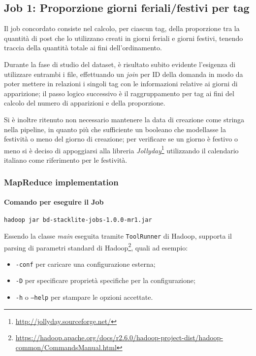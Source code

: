 

\subsection{Job 1: Proporzione giorni feriali/festivi per tag}\label{subsec:job1}
  Il job concordato consiste nel calcolo, per ciascun tag, della proporzione tra la quantità di post che lo utilizzano creati in giorni feriali e giorni festivi, tenendo traccia della quantità totale ai fini dell'ordinamento.

  Durante la fase di studio del dataset, è risultato subito evidente l'esigenza di utilizzare entrambi i file, effettuando un \textit{join} per ID della domanda in modo da poter mettere in relazioni i singoli tag con le informazioni relative ai giorni di apparizione;
  il passo logico successivo è il raggruppamento per tag ai fini del calcolo del numero di apparizioni e della proporzione.

  Si è inoltre ritenuto non necessario mantenere la data di creazione come stringa nella pipeline, in quanto più che sufficiente un booleano che modellasse la festività o meno del giorno di creazione;
  per verificare se un giorno è festivo o meno si è deciso di appoggiarsi alla libreria \textit{Jollyday}\footnote{\url{http://jollyday.sourceforge.net/}} utilizzando il calendario italiano come riferimento per le festività.

  \subsubsection{MapReduce implementation}\label{subsub:job1:mapreduce}

  \paragraph{Comando per eseguire il Job}\label{par:job1:mapreduce:cmd}

  \texttt{hadoop jar bd-stacklite-jobs-1.0.0-mr1.jar}

  Essendo la classe \textit{main} eseguita tramite \texttt{ToolRunner} di Hadoop,
  supporta il parsing di parametri standard di Hadoop\footnote{\url{https://hadoop.apache.org/docs/r2.6.0/hadoop-project-dist/hadoop-common/CommandsManual.html}}, quali ad esempio:
  \begin{itemize}
    \item \texttt{-conf} per caricare una configurazione esterna;
    \item \texttt{-D} per specificare proprietà specifiche per la configurazione;
    \item \texttt{-h} o \texttt{--help} per stampare le opzioni accettate.
  \end{itemize}

